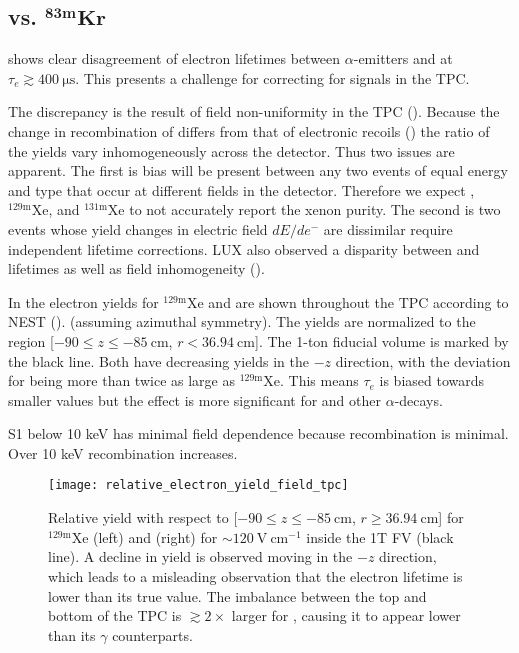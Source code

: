 \subsection{ vs. $\mathbf{^{83m}Kr}$}
\label{subsec:electron_lifetimes_rn222_vs_kr83m}
 shows clear disagreement of electron lifetimes between $\alpha$-emitters and \metakr
at $\tau_e \gtrsim 400\ \mathrm{\mu s}$.  This presents a challenge for correcting \stwob for signals in the TPC.

The discrepancy is the result of field non-uniformity in the TPC ().  Because the change in recombination
of \alphadecays differs from that of electronic recoils () the ratio of the \electron yields vary
inhomogeneously across the detector.  Thus two issues are apparent.  The first is bias will be present between any two events of equal
energy and type that occur at different fields in the detector.  Therefore we expect \metakr, $\mathrm{^{129m}Xe}$, and
$\mathrm{^{131m}Xe}$ to not accurately report the xenon purity.  The second is two events whose \electron yield changes in electric field
$dE/de^-$ are dissimilar require independent lifetime corrections.  LUX also observed a disparity between \metakr and 
lifetimes as well as field inhomogeneity ().

In  the electron yields for $\mathrm{^{129m}Xe}$ and 
are shown throughout the TPC according to NEST (). (assuming azimuthal symmetry).  The yields are normalized to the
region [$-90 \leq z \leq -85\ \mathrm{cm}$,
$r < 36.94\ \mathrm{cm}$].  The 1-ton fiducial volume is marked by the black line.  Both have decreasing yields in the $-z$ direction,
with the deviation for  being more than twice as large as $\mathrm{^{129m}Xe}$.  This means $\tau_e$ is biased towards
smaller values but the effect is more significant for  and other $\alpha$-decays.

S1 below 10 keV has minimal field dependence because recombination is minimal.  Over 10 keV recombination increases.

\begin{figure}
\centering
\texttt{[image: relative\_electron\_yield\_field\_tpc]}
\caption{Relative \electron yield with respect to [$-90 \leq z \leq -85\ \mathrm{cm}$, $r \geq 36.94\ \mathrm{cm}$] for
$\mathrm{^{129m}Xe}$ (left) and  (right) for ${\sim}120\ \mathrm{V\ cm^{-1}}$ inside the 1T FV (black line).  A decline in
yield is
observed moving in the $-z$ direction, which leads to a misleading observation that the electron lifetime is lower than its true
value.  The imbalance between the top
and bottom of the TPC is $\gtrsim 2\times$ larger for , causing it to appear lower than its $\gamma$ counterparts.}
\label{fig:electron_lifetimes_rn222_vs_kr83m_field_tpc}
\end{figure}

